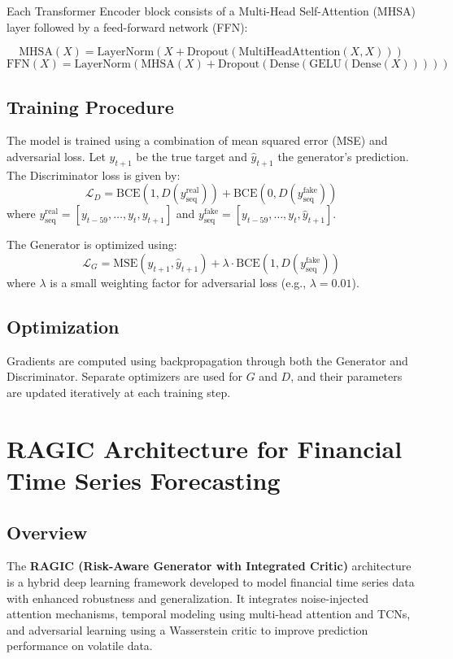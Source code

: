 \begingroup
\sloppy
Each Transformer Encoder block consists of a Multi-Head Self-Attention (MHSA) layer followed by a feed-forward network (FFN):
\endgroup

\[
\text{MHSA}(X) = \text{LayerNorm}(X + \text{Dropout}(\text{MultiHeadAttention}(X, X)))
\]
\[
\text{FFN}(X) = \text{LayerNorm}(\text{MHSA}(X) + \text{Dropout}(\text{Dense}(\text{GELU}(\text{Dense}(X)))))
\]

\subsection{Training Procedure}

The model is trained using a combination of mean squared error (MSE) and adversarial loss. Let $y_{t+1}$ be the true target and $\hat{y}_{t+1}$ the generator's prediction. The Discriminator loss is given by:
\[
\mathcal{L}_D = \text{BCE}(1, D(y_{\text{seq}}^{\text{real}})) + \text{BCE}(0, D(y_{\text{seq}}^{\text{fake}}))
\]
where $y_{\text{seq}}^{\text{real}} = [y_{t-59}, \dots, y_t, y_{t+1}]$ and $y_{\text{seq}}^{\text{fake}} = [y_{t-59}, \dots, y_t, \hat{y}_{t+1}]$.

The Generator is optimized using:
\[
\mathcal{L}_G = \text{MSE}(y_{t+1}, \hat{y}_{t+1}) + \lambda \cdot \text{BCE}(1, D(y_{\text{seq}}^{\text{fake}}))
\]
where $\lambda$ is a small weighting factor for adversarial loss (e.g., $\lambda = 0.01$).

\subsection{Optimization}

Gradients are computed using backpropagation through both the Generator and Discriminator. Separate optimizers are used for $G$ and $D$, and their parameters are updated iteratively at each training step.

\section{RAGIC Architecture for Financial Time Series Forecasting}

\subsection{Overview}

The \textbf{RAGIC (Risk-Aware Generator with Integrated Critic)} architecture is a hybrid deep learning framework developed to model financial time series data with enhanced robustness and generalization. It integrates noise-injected attention mechanisms, temporal modeling using multi-head attention and TCNs, and adversarial learning using a Wasserstein critic to improve prediction performance on volatile data.

